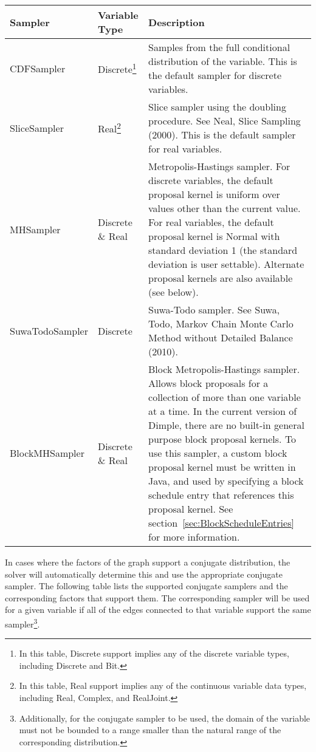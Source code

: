 \begin{longtable} {l l p{8.0cm}}
Sampler & Variable Type &  Description \\
\hline
\endhead
CDFSampler & Discrete\footnote{In this table, Discrete support implies any of the discrete variable types, including Discrete and Bit.} & Samples from the full conditional distribution of the variable.  This is the default sampler for discrete variables. \\
SliceSampler & Real\footnote{In this table, Real support implies any of the continuous variable data types, including Real, Complex, and RealJoint.} & Slice sampler using the doubling procedure.  See Neal, Slice Sampling (2000).  This is the default sampler for real variables. \\
MHSampler & Discrete \& Real & Metropolis-Hastings sampler.  For discrete variables, the default proposal kernel is uniform over values other than the current value.  For real variables, the default proposal kernel is Normal with standard deviation 1 (the standard deviation is user settable).  Alternate proposal kernels are also available (see below). \\
SuwaTodoSampler & Discrete & Suwa-Todo sampler.  See Suwa, Todo, Markov Chain Monte Carlo Method without Detailed Balance (2010). \\
BlockMHSampler & Discrete \& Real & Block Metropolis-Hastings sampler.  Allows block proposals for a collection of more than one variable at a time.  In the current version of Dimple, there are no built-in general purpose block proposal kernels.  To use this sampler, a custom block proposal kernel must be written in Java, and used by specifying a block schedule entry that references this proposal kernel.  See section~\ref{sec:BlockScheduleEntries} for more information.
\end{longtable}


In cases where the factors of the graph support a conjugate distribution, the solver will automatically determine this and use the appropriate conjugate sampler.  The following table lists the supported conjugate samplers and the corresponding factors that support them.  The corresponding sampler will be used for a given variable if all of the edges connected to that variable support the same sampler\footnote{Additionally, for the conjugate sampler to be used, the domain of the variable must not be bounded to a range smaller than the natural range of the corresponding distribution.}.

